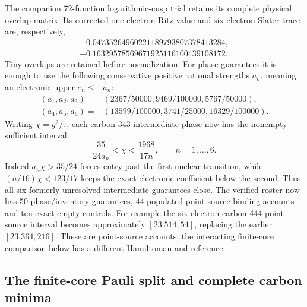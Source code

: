 The companion 72-function logarithmic-cusp trial retains its complete
physical overlap matrix. Its corrected one-electron Ritz value and
six-electron Slater trace are, respectively,
\begin{align*}
 -0.04735264960221189793807378413284,\\
 -0.16329578569671925116100439108172.
\end{align*}
Tiny overlaps are retained before normalization. For phase guarantees it
is enough to use the following conservative positive rational strengths
$a_n$, meaning an electronic upper $e_n\le-a_n$:
\begin{equation}
\begin{split}
(a_1,a_2,a_3)={}&(2367/50000,9469/100000,5767/50000),\\
(a_4,a_5,a_6)={}&(13599/100000,3741/25000,16329/100000).
\end{split}
\end{equation}
Writing $\chi=g^2/\tau$, each carbon-343 intermediate phase now has the
nonempty sufficient interval
\begin{equation}
 \frac{35}{24a_n}<\chi<\frac{1968}{17n},\qquad n=1,\ldots,6.
\label{eq:343-all-six-12}
\end{equation}
Indeed $a_n\chi>35/24$ forces entry past the first nuclear transition,
while $(n/16)\chi<123/17$ keeps the exact electronic coefficient below
the second. Thus all six formerly unresolved intermediate guarantees
close. The verified roster now has 50 phase/inventory guarantees,
44 populated point-source binding accounts and ten exact empty controls.
For example the six-electron carbon-444 point-source interval becomes
approximately $[23.514,54]$, replacing the earlier $[23.364,216]$.
These are point-source accounts; the interacting finite-core comparison
below has a different Hamiltonian and reference.

\subsection{The finite-core Pauli split and complete carbon minima}
\label{sec:finite-core-12}

